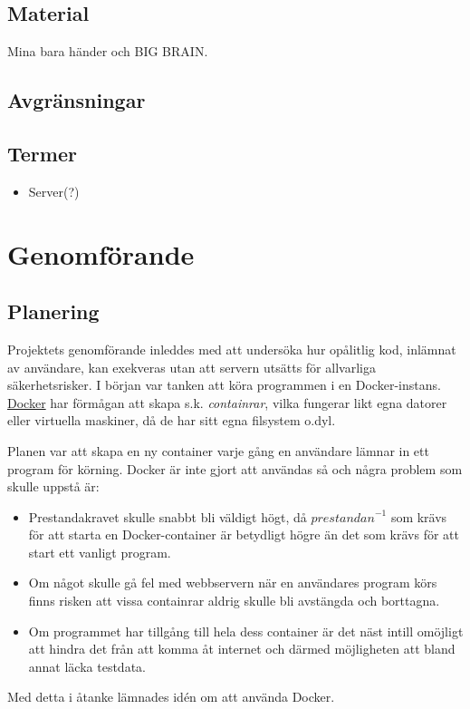 \documentclass[swedish]{article}
\begin{document}

\subsection{Material}

Mina bara händer och BIG BRAIN.

\subsection{Avgränsningar}

\subsection{Termer}

\begin{itemize}
	\item Server(?)
\end{itemize}

\section{Genomförande}

\subsection{Planering}

Projektets genomförande inleddes med att undersöka hur opålitlig kod, inlämnat
av användare, kan exekveras utan att servern utsätts för allvarliga
säkerhetsrisker. I början var tanken att köra programmen i en Docker-instans.
\href{https://www.docker.com}{Docker} har förmågan att skapa s.k.
\textit{containrar}, vilka fungerar likt egna datorer eller virtuella maskiner,
då de har sitt egna filsystem o.dyl.

Planen var att skapa en ny container varje gång en användare lämnar in ett
program för körning. Docker är inte gjort att användas så och några problem som
skulle uppstå är:
\begin{itemize}
	\item Prestandakravet skulle snabbt bli väldigt högt, då ${prestandan}^{-1}$
		som krävs för att starta en Docker-container är betydligt högre än det
		som krävs för att start ett vanligt program.
	\item Om något skulle gå fel med webbservern när en användares program körs
		finns risken att vissa containrar aldrig skulle bli avstängda och
		borttagna.
	\item Om programmet har tillgång till hela dess container är det näst
		intill omöjligt att hindra det från att komma åt internet och därmed
		möjligheten att bland annat läcka testdata.
\end{itemize}
Med detta i åtanke lämnades idén om att använda Docker.
\end{document}
